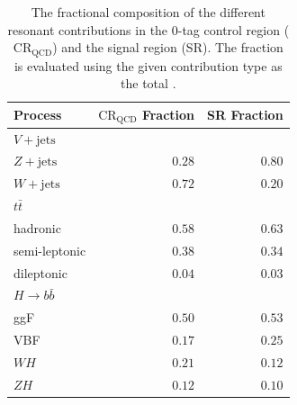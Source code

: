 \begin{table}[htpb]
 \centering
 \caption{The fractional composition of the different resonant contributions in the $0$-tag control region ($\text{CR}_{\text{QCD}}$) and the signal region (SR). The fraction is evaluated using the given contribution type as the total \cite{Alison:2649017}.}
 \begin{tabular}{@{}lrr@{}}
  \toprule
  Process                                   & $\text{CR}_{\text{QCD}}$ Fraction & SR Fraction \\ \midrule
  $V+\text{jets}$                                  &                   &             \\
  \phantom{$V+\text{jets}$\quad} $Z+\text{jets}$ & $0.28$            & $0.80$      \\
  \phantom{$V+\text{jets}$\quad} $W+\text{jets}$ & $0.72$            & $0.20$      \\
  $t\bar{t}$                                &                   &             \\
  \phantom{$t\bar{t}$\quad} hadronic        & $0.58$            & $0.63$      \\
  \phantom{$t\bar{t}$\quad} semi-leptonic   & $0.38$            & $0.34$      \\
  \phantom{$t\bar{t}$\quad} dileptonic      & $0.04$            & $0.03$      \\
  $H \rightarrow b\bar{b}$                                    &                   &             \\
  \phantom{$H \rightarrow b\bar{b}$\quad} ggF                 & $0.50$            & $0.53$      \\
  \phantom{$H \rightarrow b\bar{b}$\quad} VBF                 & $0.17$            & $0.25$      \\
  \phantom{$H \rightarrow b\bar{b}$\quad} $WH$                & $0.21$            & $0.12$      \\
  \phantom{$H \rightarrow b\bar{b}$\quad} $ZH$                & $0.12$            & $0.10$      \\
  \bottomrule
 \end{tabular}
 \label{table:fractional_composition}
\end{table}
